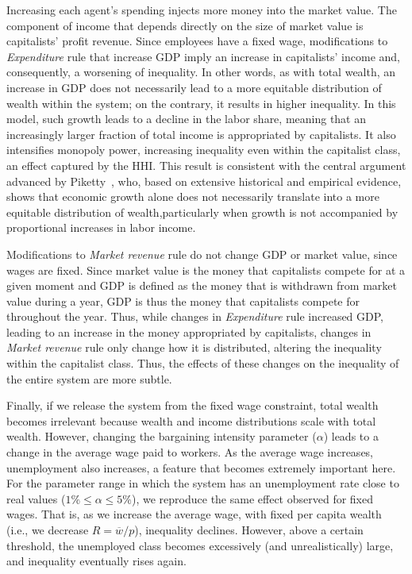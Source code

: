 Increasing each agent's spending injects more money into the market value. The component of income that depends directly on the size of market value is capitalists’ profit revenue. Since employees have a fixed wage, modifications to \textit{Expenditure } rule that increase GDP imply an increase in capitalists' income and, consequently, a worsening of inequality. In other words, as with total wealth, an increase in GDP does not necessarily lead to a more equitable distribution of wealth within the system; on the contrary, it results in higher inequality. In this model, such growth leads to a decline in the labor share, meaning that an increasingly larger fraction of total income is appropriated by capitalists. It also intensifies monopoly power, increasing inequality even within the capitalist class, an effect captured by the HHI. This result is consistent with the central argument advanced by Piketty~\cite{piketty2014capital}, who, based on extensive historical and empirical evidence, shows that economic growth alone does not necessarily translate into a more equitable distribution of wealth,particularly when growth is not accompanied by proportional increases in labor income.

Modifications to \textit{Market revenue} rule do not change GDP or market value, since wages are fixed. Since market value is the money that capitalists compete for at a given moment and GDP is defined as the money that is withdrawn from market value during a year, GDP is thus the money that capitalists compete for throughout the year. Thus, while changes in \textit{Expenditure} rule increased GDP, leading to an increase in the money appropriated by capitalists, changes in \textit{Market revenue} rule only change how it is distributed, altering the inequality within the capitalist class. Thus, the effects of these changes on the inequality of the entire system are more subtle.

Finally, if we release the system from the fixed wage constraint, total wealth becomes irrelevant because wealth and income distributions scale with total wealth. However, changing the bargaining intensity parameter ($\alpha$) leads to a change in the average wage paid to workers. As the average wage increases, unemployment also increases, a feature that becomes extremely important here. For the parameter range in which the system has an unemployment rate close to real values ($1\%\leq\alpha\leq5\%$), we reproduce the same effect observed for fixed wages. That is, as we increase the average wage, with fixed per capita wealth (i.e., we decrease $R=\overline{w}/p$), inequality declines. However, above a certain threshold, the unemployed class becomes excessively (and unrealistically) large, and inequality eventually rises again.%

